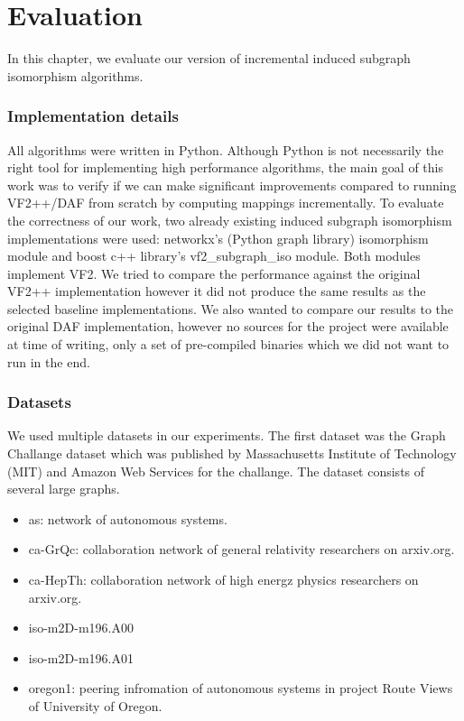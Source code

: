 \chapter{Evaluation}

In this chapter, we evaluate our version of incremental induced subgraph isomorphism algorithms.

\subsection{Implementation details}

All algorithms were written in Python. Although Python is not necessarily the right tool 
for implementing high performance algorithms, the main goal of this work was to verify if
we can make significant improvements compared to running VF2++/DAF from scratch by computing
mappings incrementally. To evaluate the correctness of our work, two already existing induced 
subgraph isomorphism implementations were used: networkx's (Python graph library) isomorphism 
module and boost c++ library's vf2\_subgraph\_iso module\cite{boostvf2}. Both modules implement VF2. We 
tried to compare the performance against the original VF2++ implementation \cite{lemonvf2pp}
however it did not produce the same results as the selected baseline implementations. We also
wanted to compare our results to the original DAF implementation, however no sources for the
project were available at time of writing, only a set of pre-compiled binaries \cite{dafbin}
which we did not want to run in the end.

\subsection{Datasets}

We used multiple datasets in our experiments. The first dataset was the Graph Challange\cite{graphchallenge} dataset
which was published by Massachusetts Institute of Technology (MIT) and Amazon Web Services for
the challange. The dataset consists of several large graphs. 

\begin{itemize}
    \item as: network of autonomous systems.
    \item ca-GrQc: collaboration network of general relativity researchers on arxiv.org.
    \item ca-HepTh: collaboration network of high energz physics researchers on arxiv.org.
    \item iso-m2D-m196.A00
    \item iso-m2D-m196.A01
    \item oregon1: peering infromation of autonomous systems in project Route Views of University of Oregon.
\end{itemize}

